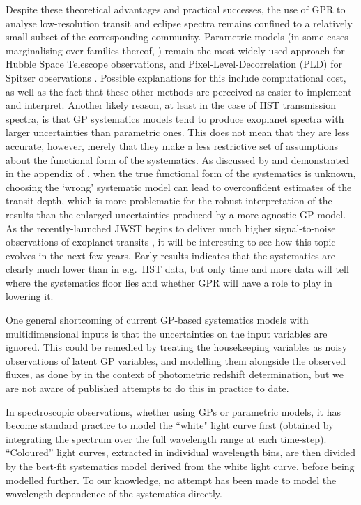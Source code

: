 \documentclass[letterpaper]{ar-1col}
\begin{document}
Despite these theoretical advantages and practical successes, the use of GPR to analyse low-resolution transit and eclipse spectra remains confined to a relatively small subset of the corresponding community. Parametric models (in some cases marginalising over families thereof, \citealt{2016ApJ...819...10W}) remain the most widely-used approach for Hubble Space Telescope observations, and Pixel-Level-Decorrelation (PLD) for Spitzer observations \citep{2015ApJ...805..132D}. Possible explanations for this include computational cost, as well as the fact that these other methods are perceived as easier to implement and interpret. Another likely reason, at least in the case of HST transmission spectra, is that GP systematics models tend to produce exoplanet spectra with larger uncertainties than parametric ones. This does not mean that they are less accurate, however, merely that they make a less restrictive set of assumptions about the functional form of the systematics. As discussed by \citet{2014MNRAS.445.3401G} and demonstrated in the appendix of \citet{2018AJ....156..283E}, when the true functional form of the systematics is unknown, choosing the `wrong' systematic model can lead to overconfident estimates of the transit depth, which is more problematic for the robust interpretation of the results than the enlarged uncertainties produced by a more agnostic GP model.
As the recently-launched JWST begins to deliver much higher signal-to-noise observations of exoplanet transits \citep[see e.g.][]{https://doi.org/10.48550/arxiv.2208.11692}, it will be interesting to see how this topic evolves in the next few years. Early results indicates that the systematics are clearly much lower than in e.g.\ HST data, but only time and more data will tell where the systematics floor lies and whether GPR will have a role to play in lowering it.

One general shortcoming of current GP-based systematics models with multidimensional inputs is that the uncertainties on the input variables are ignored. This could be remedied by treating the housekeeping variables as noisy observations of latent GP variables, and modelling them alongside the observed fluxes, as done by \citet{2016MNRAS.462..726A} in the context of photometric redshift determination, but we are not aware of published attempts to do this in practice to date. \begin{armarginnote}
\end{armarginnote}
In spectroscopic observations, whether using GPs or parametric models, it has become standard practice to model the ``white" light curve first (obtained by integrating the spectrum over the full wavelength range at each time-step). ``Coloured'' light curves, extracted in individual wavelength bins, are then divided by the best-fit systematics model derived from the white light curve, before being modelled further. To our knowledge, no attempt has been made to model the wavelength dependence of the systematics directly.
\end{document}
